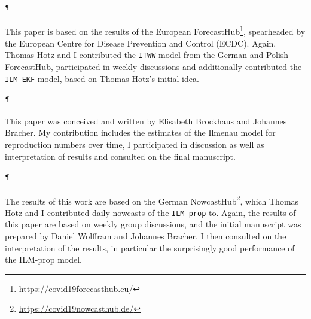 \begin{refsection}
\paragraph{\cite{Sherratt2022Predictive}$^\mathparagraph$}
This paper is based on the results of the  European ForecastHub\footnote{\url{https://covid19forecasthub.eu/}}, spearheaded by the European Centre for Disease Prevention and Control (ECDC). Again, Thomas Hotz and I contributed the \texttt{ITWW} model from the German and Polish ForecastHub, participated in weekly discussions and additionally contributed the \texttt{ILM-EKF} model, based on Thomas Hotz's initial idea. 

\paragraph{\cite{Brockhaus2023Why}$^\mathparagraph$}
This paper was conceived and written by Elisabeth Brockhaus and Johannes Bracher. My contribution includes the estimates of the Ilmenau model for reproduction numbers over time, I participated in discussion as well as interpretation of results and consulted on the final manuscript. 

\paragraph{\cite{Wolffram2023Collaborative}$^\mathparagraph$}
The results of this work are based on the German NowcastHub\footnote{\url{https://covid19nowcasthub.de/}}, which Thomas Hotz and I contributed daily nowcasts of the \texttt{ILM-prop} to. Again, the results of this paper are based on weekly group discussions, and the initial manuscript was prepared by Daniel Wolffram and Johannes Bracher. I then consulted on the interpretation of the results, in particular the surprisingly good performance of the ILM-prop model.\\[18pt]

\printbibliography[heading=custom, title={Own publications}]
\end{refsection}

